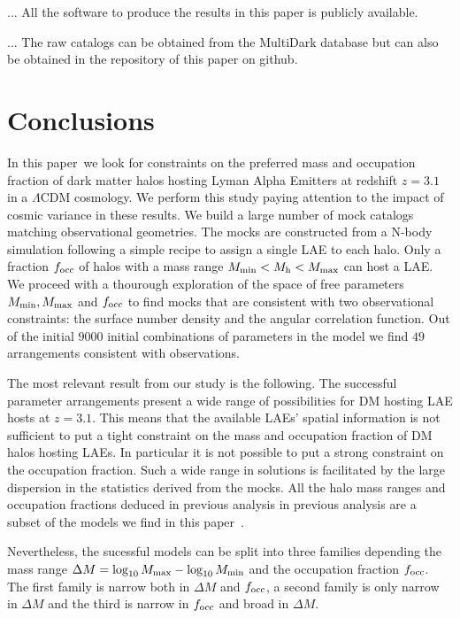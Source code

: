 \documentclass[usenatbib]{mn2e}
\newcommand{\documentname}{paper~}
\begin{document}
... All the software to produce the results in this paper is publicly
available. 

... The raw catalogs can be obtained from the MultiDark database but
can also be obtained in the repository of this paper on github.

\section{Conclusions}
\label{sec:conclusions}

In this \documentname we look for constraints on the preferred mass
and occupation fraction of dark matter halos hosting Lyman Alpha Emitters at
redshift $z=3.1$ in a $\Lambda$CDM cosmology. We perform this study
paying attention to the impact of cosmic variance in these results. We
build a large number of mock catalogs matching observational
geometries. The mocks are constructed from a N-body simulation
following a simple recipe to assign a single LAE to each halo. Only
a fraction $f_{\rm occ}$ of halos with a mass range  $M_{\rm
  min}<M_{\rm h}<M_{\rm   max}$ can host a LAE. We proceed with a
thourough exploration of the space of free parameters $M_{\rm min},
M_{\rm max}$ and $f_{\rm occ}$ to find mocks that are consistent with
two observational constraints: the surface number density and the
angular correlation function. Out of the initial $9000$ initial
combinations of parameters in the model we find $49$ arrangements
consistent with observations.


The most relevant result from our study is the following. The 
successful parameter arrangements present a wide range of possibilities for
DM hosting LAE hosts at $z=3.1$. This means that the available LAEs' spatial
information is not sufficient to put a tight constraint on the mass
and occupation fraction of DM halos hosting LAEs. In particular it is
not possible to put a strong constraint on the occupation
fraction. Such a wide range in solutions is facilitated by the large
dispersion in the statistics derived from the mocks. All the halo mass
ranges and occupation fractions deduced in previous analysis in
previous analysis \citep[i.e.][]{Gawiser2007} are a subset of the
models we find in this \documentname.  
 

Nevertheless, the sucessful models can be split into three families
depending the mass range $\Delta M=\log_{10}M_{\rm max} -
\log_{10}M_{\rm min}$ and the occupation fraction $f_{\rm occ}$. The
first family is narrow both in $\Delta M$ and $f_{\rm occ}$, a second
family is only narrow in $\Delta M$ and the third is narrow in $f_{\rm
  occ}$ and broad in $\Delta M$. 
\end{document}

